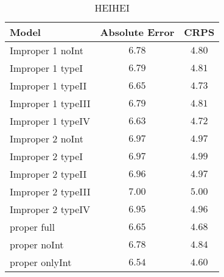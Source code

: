 \begin{table}

\caption{\label{tab:crps-ae}HEIHEI}
\centering
\begin{tabular}{lcc}
\hline
Model  & Absolute Error & \multicolumn{1}{c}{CRPS} \\ 
\hline
Improper 1 noInt  & $6.78$ & $4.80$ \\
Improper 1 typeI  & $6.79$ & $4.81$ \\
Improper 1 typeII  & $6.65$ & $4.73$ \\
Improper 1 typeIII  & $6.79$ & $4.81$ \\
Improper 1 typeIV  & $6.63$ & $4.72$ \\
Improper 2 noInt  & $6.97$ & $4.97$ \\
Improper 2 typeI  & $6.97$ & $4.99$ \\
Improper 2 typeII  & $6.96$ & $4.97$ \\
Improper 2 typeIII  & $7.00$ & $5.00$ \\
Improper 2 typeIV  & $6.95$ & $4.96$ \\
proper full  & $6.65$ & $4.68$ \\
proper noInt  & $6.78$ & $4.84$ \\
proper onlyInt  & $6.54$ & $4.60$ \\
\hline 
\end{tabular}


\end{table}